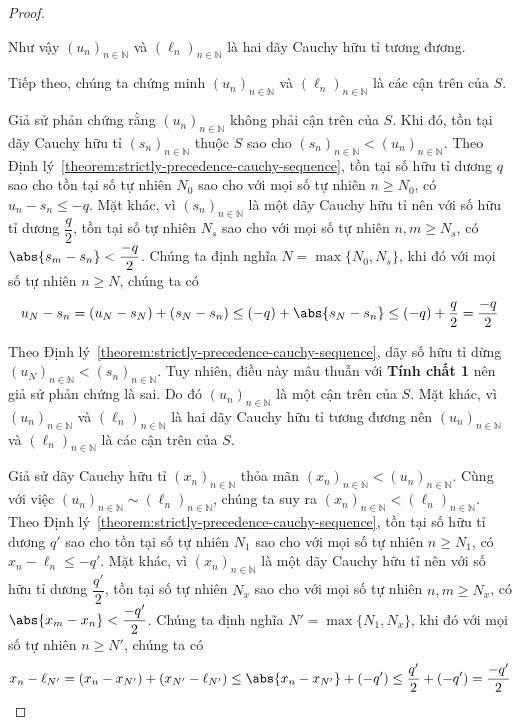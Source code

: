 \begin{proof}
\begin{enumerate}[label={\textbf{Tính chất \arabic*.}},itemindent=1.7cm]
              Như vậy ${(u_{n})}_{n\in\mathbb{N}}$ và ${(\ell_{n})}_{n\in\mathbb{N}}$ là hai dãy Cauchy hữu tỉ tương đương.
    \end{enumerate}

    Tiếp theo, chúng ta chứng minh ${(u_{n})}_{n\in\mathbb{N}}$ và ${(\ell_{n})}_{n\in\mathbb{N}}$ là các cận trên của $S$.

    Giả sử phản chứng rằng ${(u_{n})}_{n\in\mathbb{N}}$ không phải cận trên của $S$. Khi đó, tồn tại dãy Cauchy hữu tỉ ${(s_{n})}_{n\in\mathbb{N}}$ thuộc $S$ sao cho ${(s_{n})}_{n\in\mathbb{N}} < {(u_{n})}_{n\in\mathbb{N}}$. Theo Định lý~\ref{theorem:strictly-precedence-cauchy-sequence}, tồn tại số hữu tỉ dương $q$ sao cho tồn tại số tự nhiên $N_{0}$ sao cho với mọi số tự nhiên $n\geq N_{0}$, có $u_{n} - s_{n}\leq -q$. Mặt khác, vì ${(s_{n})}_{n\in\mathbb{N}}$ là một dãy Cauchy hữu tỉ nên với số hữu tỉ dương $\dfrac{q}{2}$, tồn tại số tự nhiên $N_{s}$ sao cho với mọi số tự nhiên $n, m\geq N_{s}$, có $\abs{s_{m} - s_{n}} < \dfrac{-q}{2}$. Chúng ta định nghĩa $N = \max\{ N_{0}, N_{s} \}$, khi đó với mọi số tự nhiên $n\geq N$, chúng ta có
    \[
        u_{N} - s_{n} = (u_{N} - s_{N}) + (s_{N} - s_{n}) \leq (-q) + \abs{s_{N} - s_{n}} \leq (-q) + \frac{q}{2} = \frac{-q}{2}
    \]

    Theo Định lý~\ref{theorem:strictly-precedence-cauchy-sequence}, dãy số hữu tỉ dừng ${(u_{N})}_{n\in\mathbb{N}} < {(s_{n})}_{n\in\mathbb{N}}$. Tuy nhiên, điều này mâu thuẫn với \textbf{Tính chất 1} nên giả sử phản chứng là sai. Do đó ${(u_{n})}_{n\in\mathbb{N}}$ là một cận trên của $S$. Mặt khác, vì ${(u_{n})}_{n\in\mathbb{N}}$ và ${(\ell_{n})}_{n\in\mathbb{N}}$ là hai dãy Cauchy hữu tỉ tương đương nên ${(u_{n})}_{n\in\mathbb{N}}$ và ${(\ell_{n})}_{n\in\mathbb{N}}$ là các cận trên của $S$.

    Giả sử dãy Cauchy hữu tỉ ${(x_{n})}_{n\in\mathbb{N}}$ thỏa mãn ${(x_{n})}_{n\in\mathbb{N}} < {(u_{n})}_{n\in\mathbb{N}}$. Cùng với việc ${(u_{n})}_{n\in\mathbb{N}}\sim {(\ell_{n})}_{n\in\mathbb{N}}$, chúng ta suy ra ${(x_{n})}_{n\in\mathbb{N}} < {(\ell_{n})}_{n\in\mathbb{N}}$. Theo Định lý~\ref{theorem:strictly-precedence-cauchy-sequence}, tồn tại số hữu tỉ dương $q'$ sao cho tồn tại số tự nhiên $N_{1}$ sao cho với mọi số tự nhiên $n\geq N_{1}$, có $x_{n} - \ell_{n}\leq -q'$. Mặt khác, vì ${(x_{n})}_{n\in\mathbb{N}}$ là một dãy Cauchy hữu tỉ nên với số hữu tỉ dương $\dfrac{q'}{2}$, tồn tại số tự nhiên $N_{x}$ sao cho với mọi số tự nhiên $n, m\geq N_{x}$, có $\abs{x_{m} - x_{n}} < \dfrac{-q'}{2}$. Chúng ta định nghĩa $N' = \max\{ N_{1}, N_{x} \}$, khi đó với mọi số tự nhiên $n\geq N'$, chúng ta có
    \[
        x_{n} - \ell_{N'} = (x_{n} - x_{N'}) + (x_{N'} - \ell_{N'})\leq \abs{x_{n} - x_{N'}} + (-q')\leq \frac{q'}{2} + (-q') = \frac{-q'}{2}
    \]


\end{proof}
